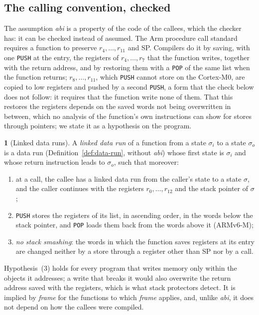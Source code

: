\documentclass[oneside,english]{amsart}
\numberwithin{equation}{section}
\theoremstyle{plain}
\theoremstyle{definition}
\newtheorem{defn}[thm]{\protect\definitionname}
\theoremstyle{plain}
\theoremstyle{plain}
\theoremstyle{remark}
\providecommand{\definitionname}{Definition}
\begin{document}
\subsection{The calling convention, checked}
\label{subsec:conv}

The assumption \emph{abi} is a property of the code of the callees, which the checker has: it can be checked instead of assumed. The Arm procedure call standard requires a function to preserve $r_4, \dots, r_{11}$ and SP. Compilers do it by saving, with one \texttt{PUSH} at the entry, the registers of $r_4, \dots, r_7$ that the function writes, together with the return address, and by restoring them with a \texttt{POP} of the same list when the function returns; $r_8, \dots, r_{11}$, which \texttt{PUSH} cannot store on the Cortex-M0, are copied to low registers and pushed by a second \texttt{PUSH}, a form that the check below does not follow: it requires that the function write none of them. That this restores the registers depends on the saved words not being overwritten in between, which no analysis of the function's own instructions can show for stores through pointers; we state it as a hypothesis on the program.

\begin{defn}[Linked data runs]
\label{def:linked-run}
A \emph{linked data run} of a function from a state $\sigma_i$ to a state $\sigma_o$ is a data run (Definition~\ref{def:data-run}, without \emph{abi}) whose first state is $\sigma_i$ and whose return instruction leads to $\sigma_o$, such that moreover:
\begin{enumerate}
    \item at a call, the callee has a linked data run from the caller's state to a state $\sigma$, and the caller continues with the registers $r_0, \dots, r_{12}$ and the stack pointer of $\sigma$;
    \item \texttt{PUSH} stores the registers of its list, in ascending order, in the words below the stack pointer, and \texttt{POP} loads them back from the words above it (ARMv6-M);
    \item \emph{no stack smashing}: the words in which the function saves registers at its entry are changed neither by a store through a register other than SP nor by a call.
\end{enumerate}
\end{defn}

Hypothesis~(3) holds for every program that writes memory only within the objects it addresses; a write that breaks it would also overwrite the return address saved with the registers, which is what stack protectors detect. It is implied by \emph{frame} for the functions to which \emph{frame} applies, and, unlike \emph{abi}, it does not depend on how the callees were compiled.
\end{document}
